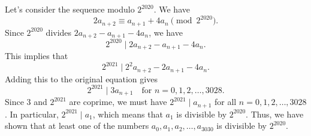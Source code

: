 Let's consider the sequence modulo \(2^{2020}\). We have
\[
2a_{n+2} \equiv a_{n+1} + 4a_n \pmod{2^{2020}}.
\]
Since \(2^{2020}\) divides \(2a_{n+2} - a_{n+1} - 4a_n\), we have
\[
2^{2020} \mid 2a_{n+2} - a_{n+1} - 4a_n.
\]
This implies that
\[
2^{2021} \mid 2^2a_{n+2} - 2a_{n+1} - 4a_n.
\]
Adding this to the original equation gives
\[
2^{2021} \mid 3a_{n+1} \quad \text{for } n = 0, 1, 2, \dots, 3028.
\]
Since \(3\) and \(2^{2021}\) are coprime, we must have \(2^{2021} \mid a_{n+1}\) for all \(n = 0, 1, 2, \dots, 3028\). In particular, \(2^{2021} \mid a_1\), which means that \(a_1\) is divisible by \(2^{2020}\). Thus, we have shown that at least one of the numbers \(a_0, a_1, a_2, \dots, a_{3030}\) is divisible by \(2^{2020}\).
